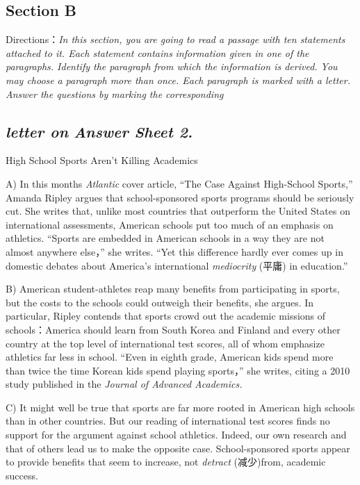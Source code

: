 \documentclass[UTF8,11pt]{ctexart}
\begin{document}
\subsection*{\textbf{Section B}}


Directions：\textit{In this section, you are going to read a passage with ten statements attached to it. Each statement contains} \textit{information given in one of the paragraphs. Identify the paragraph from which the information is derived. You may choose} \textit{a paragraph more than once. Each paragraph is marked with a letter. Answer the questions by marking the corresponding}


\subsection*{\textit{letter on}\textbf{\textit{ Answer Sheet 2.}}}


High School Sports Aren’t Killing Academics


A) In this months\textit{ Atlantic} cover article, “The Case Against High-School Sports,” Amanda Ripley argues that school-sponsored sports programs should be seriously cut. She writes that, unlike most countries that outperform the United States on international assessments, American schools put too much of an emphasis on athletics. “Sports are embedded in American schools in a way they are not almost anywhere else，” she writes. “Yet this difference hardly ever comes up in domestic debates about America’s international\textit{ mediocrity} (平庸) in education.”


B) American student-athletes reap many benefits from participating in sports, but the costs to the schools could outweigh their benefits, she argues. In particular, Ripley contends that sports crowd out the academic missions of schools：America should learn from South Korea and Finland and every other country at the top level of international test scores, all of whom emphasize athletics far less in school. “Even in eighth grade, American kids spend more than twice the time Korean kids spend playing sports，” she writes, citing a 2010 study published in the\textit{ Journal of Advanced Academics.}


C) It might well be true that sports are far more rooted in American high schools than in other countries. But our reading of international test scores finds no support for the argument against school athletics. Indeed, our own research and that of others lead us to make the opposite case. School-sponsored sports appear to provide benefits that seem to increase, not\textit{ detract} (减少)from, academic success.
\end{document}
